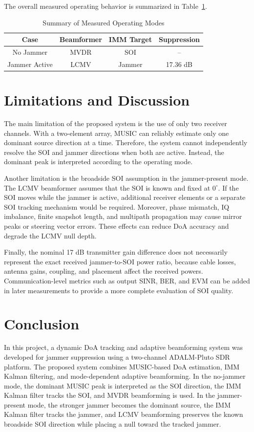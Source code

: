 \documentclass[conference]{IEEEtran}
\begin{document}
\FloatBarrier

The overall measured operating behavior is summarized in Table~\ref{tab:results_summary}.

\begin{table}[!htbp]
\caption{Summary of Measured Operating Modes}
\label{tab:results_summary}
\centering
\footnotesize
\begin{tabular}{|c|c|c|c|}
\hline
\textbf{Case} & \textbf{Beamformer} & \textbf{IMM Target} & \textbf{Suppression} \\
\hline
No Jammer & MVDR & SOI & -- \\
Jammer Active & LCMV & Jammer & 17.36 dB \\
\hline
\end{tabular}
\end{table}

\FloatBarrier

\section{Limitations and Discussion}
The main limitation of the proposed system is the use of only two receiver channels. With a two-element array, MUSIC can reliably estimate only one dominant source direction at a time. Therefore, the system cannot independently resolve the SOI and jammer directions when both are active. Instead, the dominant peak is interpreted according to the operating mode.

Another limitation is the broadside SOI assumption in the jammer-present mode. The LCMV beamformer assumes that the SOI is known and fixed at $0^\circ$. If the SOI moves while the jammer is active, additional receiver elements or a separate SOI tracking mechanism would be required. Moreover, phase mismatch, IQ imbalance, finite snapshot length, and multipath propagation may cause mirror peaks or steering vector errors. These effects can reduce DoA accuracy and degrade the LCMV null depth.

Finally, the nominal 17 dB transmitter gain difference does not necessarily represent the exact received jammer-to-SOI power ratio, because cable losses, antenna gains, coupling, and placement affect the received powers. Communication-level metrics such as output SINR, BER, and EVM can be added in later measurements to provide a more complete evaluation of SOI quality.

\section{Conclusion}
In this project, a dynamic DoA tracking and adaptive beamforming system was developed for jammer suppression using a two-channel ADALM-Pluto SDR platform. The proposed system combines MUSIC-based DoA estimation, IMM Kalman filtering, and mode-dependent adaptive beamforming. In the no-jammer mode, the dominant MUSIC peak is interpreted as the SOI direction, the IMM Kalman filter tracks the SOI, and MVDR beamforming is used. In the jammer-present mode, the stronger jammer becomes the dominant source, the IMM Kalman filter tracks the jammer, and LCMV beamforming preserves the known broadside SOI direction while placing a null toward the tracked jammer.
\end{document}
